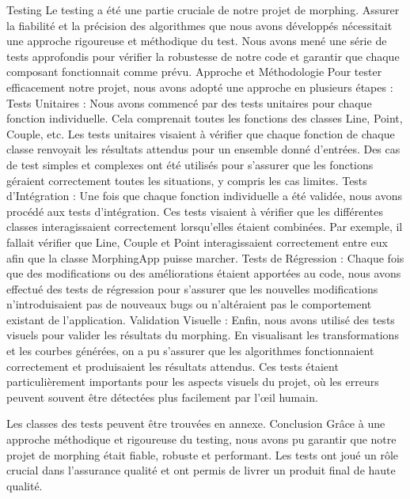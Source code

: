 Testing
Le testing a été une partie cruciale de notre projet de morphing. Assurer la fiabilité et la précision des algorithmes que nous avons développés nécessitait une approche rigoureuse et méthodique du test. Nous avons mené une série de tests approfondis pour vérifier la robustesse de notre code et garantir que chaque composant fonctionnait comme prévu.
Approche et Méthodologie
Pour tester efficacement notre projet, nous avons adopté une approche en plusieurs étapes :
Tests Unitaires :
Nous avons commencé par des tests unitaires pour chaque fonction individuelle. Cela comprenait toutes les fonctions des classes Line, Point, Couple, etc. Les tests unitaires visaient à vérifier que chaque fonction de chaque classe renvoyait les résultats attendus pour un ensemble donné d'entrées. Des cas de test simples et complexes ont été utilisés pour s'assurer que les fonctions géraient correctement toutes les situations, y compris les cas limites.
Tests d'Intégration :
Une fois que chaque fonction individuelle a été validée, nous avons procédé aux tests d'intégration. Ces tests visaient à vérifier que les différentes classes interagissaient correctement lorsqu'elles étaient combinées. Par exemple, il fallait vérifier que Line, Couple et Point interagissaient correctement entre eux afin que la classe MorphingApp puisse marcher.
Tests de Régression :
Chaque fois que des modifications ou des améliorations étaient apportées au code, nous avons effectué des tests de régression pour s'assurer que les nouvelles modifications n'introduisaient pas de nouveaux bugs ou n'altéraient pas le comportement existant de l'application.
Validation Visuelle :
Enfin, nous avons utilisé des tests visuels pour valider les résultats du morphing. En visualisant les transformations et les courbes générées, on a pu s'assurer que les algorithmes fonctionnaient correctement et produisaient les résultats attendus. Ces tests étaient particulièrement importants pour les aspects visuels du projet, où les erreurs peuvent souvent être détectées plus facilement par l'œil humain.

Les classes des tests peuvent être trouvées en annexe.
Conclusion
Grâce à une approche méthodique et rigoureuse du testing, nous avons pu garantir que notre projet de morphing était fiable, robuste et performant. Les tests ont joué un rôle crucial dans l'assurance qualité et ont permis de livrer un produit final de haute qualité.

